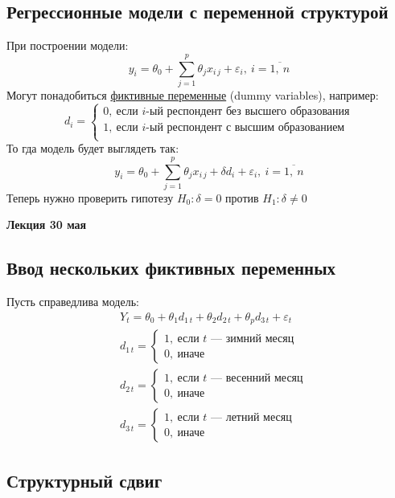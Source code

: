 \documentclass[12pt, a4paper]{article}
\begin{document}
\subsection*{Регрессионные модели с переменной структурой}
При построении модели:
\[
y_i = \theta_0 + \sum_{j = 1}^{p} \theta_j x_{i\, j} + \varepsilon_i,\ i = \overline{1,\ n} 
\]
Могут понадобиться \underline{фиктивные переменные} (dummy variables), например:
\[
d_i = \begin{cases}
    0,\ \text{если $i$-ый респондент без высшего образования}\\
    1,\ \text{если $i$-ый респондент с высшим образованием}\\
\end{cases}
\]
То
гда модель будет выглядеть так:
\[
y_i = \theta_0 + \sum_{j = 1}^{p} \theta_j x_{i\, j} + \delta d_i + \varepsilon_i,\ i = \overline{1,\ n}     
\]
Теперь нужно проверить гипотезу $H_0: \delta = 0$ против $H_1: \delta \neq 0$

\newpage
\begin{center}
    \bf Лекция 30 мая
\end{center}
\subsection*{Ввод нескольких фиктивных переменных}
Пусть справедлива модель:
\[
\begin{aligned}
    & Y_t = \theta_0 + \theta_1 d_{1\, t} + \theta_2 d_{2\, t} + \theta_p d_{3\, t} + \varepsilon_t\\
    & d_{1\, t} = \begin{cases}
        1,\ \text{если $t$ --- зимний месяц}\\
        0,\ \text{иначе}
    \end{cases}\\
    & d_{2\, t} = \begin{cases}
        1,\ \text{если $t$ --- весенний месяц}\\
        0,\ \text{иначе}
    \end{cases}\\
    & d_{3\, t} = \begin{cases}
        1,\ \text{если $t$ --- летний месяц}\\
        0,\ \text{иначе}
    \end{cases}
\end{aligned}
\]
\subsection*{Структурный сдвиг}
\end{document}

